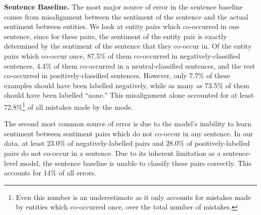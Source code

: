 \documentclass[11pt,a4paper]{article}
\begin{document}
\noindent\textbf{Sentence Baseline.}
The most major source of error in the sentence baseline comes from misalignment between the sentiment of the sentence and the actual sentiment between entities.
We look at entity pairs which co-occurred in one sentence, since for these pairs, the sentiment of the entity pair is exactly determined by the sentiment of the sentence that they co-occur in.
Of the entity pairs which co-occur once, 87.5\% of them co-occurred in negatively-classified sentences, 4.4\% of them co-occurred in a neutral-classified sentences, and the rest co-occurred in positively-classified sentences.
However, only 7.7\% of these examples should have been labelled negatively, while as many as 73.5\% of them should have been labelled ``none."
This misalignment alone accounted for at least 72.8\%\footnote{Even this number is an underestimate as it only accounts for mistakes made by entities which co-occurred once, over the total number of mistakes.} of all mistakes made by the mode.
\par The second most common source of error is due to the model's inability to learn sentiment between sentiment pairs which do not co-occur in any sentence.
In our data, at least 23.0\% of negatively-labelled pairs and 28.0\% of positively-labelled pairs do not co-occur in a sentence.
Due to its inherent limitation as a sentence-level model, the sentence baseline is unable to classify these pairs correctly.
This accounts for 14\% of all errors.
\end{document}
